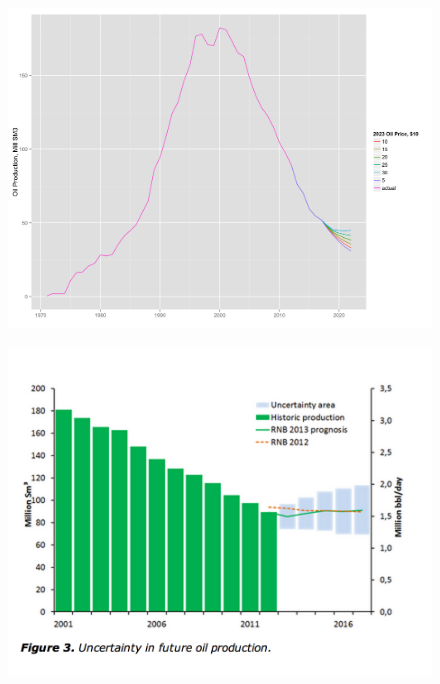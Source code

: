\documentclass{beamer}
\begin{document}
\begin{frame}[plain]
	\begin{figure}
		\includegraphics[width=.8\textwidth]{tot_forecast.png}
		\caption{}
		\label{tot_forecast}
	\end{figure}

\end{frame}

\begin{frame}[plain]
\begin{figure}
		\includegraphics[width=.8\textwidth]{NPD_oil_forecast.png}
		\caption{}
		\label{NPD_oil_forecast}
	\end{figure}
\end{frame}
\end{document}
